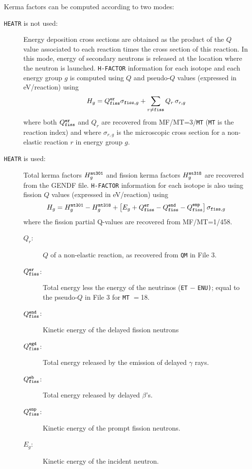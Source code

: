 Kerma factors can be computed according to two modes:
\begin{description}
\item[{\tt HEATR} is not used:] Energy deposition cross sections are obtained
as the product of the $Q$ value associated to each reaction times the cross
section of this reaction. In this mode, energy of secondary neutrons is
released at the location where the neutron is launched. {\tt H-FACTOR}
information for each isotope and each energy group $g$ is computed using $Q$
and pseudo-$Q$ values (expressed in eV/reaction) using
\vspace{-0.04cm}
$$
H_g=Q_{\tt fiss}^{\tt er} \sigma_{{\tt fiss},g} + \sum_{r\neq {\tt fiss}} Q_r
\, \sigma_{r,g}
$$
\noindent where both $Q_{\tt fiss}^{\tt er}$ and $Q_r$ are recovered from
MF/MT=3/{\tt MT} ({\tt MT} is the reaction index) and where $\sigma_{r,g}$ is
the microscopic cross section for a non-elastic reaction $r$ in energy group
$g$.

\item[{\tt HEATR} is used:] Total kerma factors $H_g^{\tt mt301}$ and fission
kerma factors $H_g^{\tt mt318}$ are recovered from the GENDF file.
{\tt H-FACTOR} information for each isotope is also using fission $Q$ values
(expressed in eV/reaction) using
\vspace{-0.1cm}
$$
H_g=H_g^{\tt mt301}-H_g^{\tt mt318}+\left[E_g+Q_{\tt fiss}^{\tt er} -
Q_{\tt fiss}^{\tt end}-Q_{\tt fiss}^{\tt enp}\right] \sigma_{{\tt fiss},g}
$$
\noindent where the fission partial Q-values are recovered from MF/MT=1/458.
\begin{description}
\item[$Q_r $:] $Q$ of a non-elastic reaction, as recovered from {\tt QM} in
File 3.
\item[$Q_{\tt fiss}^{\tt er}$:] Total energy less the energy of the neutrinos
({\tt ET} $-$ {\tt ENU)}; equal to the pseudo-$Q$ in File 3 for {\tt MT} $=$18.
\item[$Q_{\tt fiss}^{\tt end}$:] Kinetic energy of the delayed fission neutrons
\item[$Q_{\tt fiss}^{\tt egd}$:] Total energy released by the emission of
delayed $\gamma$ rays.
\item[$Q_{\tt fiss}^{\tt eb}$:] Total energy released by delayed $\beta$'s.
\item[$Q_{\tt fiss}^{\tt enp}$:] Kinetic energy of the prompt fission neutrons.
\item[$E_g$:] Kinetic energy of the incident neutron.
\end{description}
\end{description}

